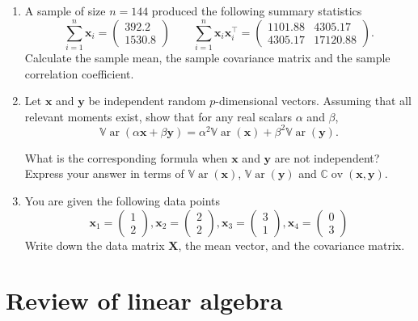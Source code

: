 \documentclass[
]{book}
\theoremstyle{definition}
\theoremstyle{definition}
\theoremstyle{definition}
\theoremstyle{definition}
\theoremstyle{remark}
\begin{document}
\begin{enumerate}
\def\labelenumi{\arabic{enumi}.}
\setcounter{enumi}{2}
\item
  A sample of size \(n=144\) produced the following summary statistics
  \[ \sum_{i=1}^n \mathbf x_i = \begin{pmatrix} 392.2 \\ 1530.8 \end{pmatrix} \qquad \sum_{i=1}^n \mathbf x_i \mathbf x_i^\top = \begin{pmatrix} 1101.88 & 4305.17 \\ 4305.17 & 17120.88 \end{pmatrix}.\]
  Calculate the sample mean, the sample covariance matrix and the sample correlation coefficient.
\item
  Let \(\mathbf x\) and \(\mathbf y\) be independent random \(p\)-dimensional vectors. Assuming that all relevant moments exist, show that for any real scalars \(\alpha\) and \(\beta\),
  \[{\mathbb{V}\operatorname{ar}}(\alpha \mathbf x+ \beta \mathbf y) = \alpha^2 {\mathbb{V}\operatorname{ar}}(\mathbf x) + \beta^2 {\mathbb{V}\operatorname{ar}}(\mathbf y).\]

  What is the corresponding formula when \(\mathbf x\) and \(\mathbf y\) are not independent? Express your answer in terms of \({\mathbb{V}\operatorname{ar}}(\mathbf x)\), \({\mathbb{V}\operatorname{ar}}(\mathbf y)\) and \({\mathbb{C}\operatorname{ov}}(\mathbf x, \mathbf y)\).
\item
  You are given the following data points
  \[\mathbf x_1 = \begin{pmatrix} 1\\ 2\end{pmatrix}, \mathbf x_2 = \begin{pmatrix} 2 \\ 2\end{pmatrix}, \mathbf x_3 = \begin{pmatrix} 3\\ 1\end{pmatrix}, \mathbf x_4 = \begin{pmatrix} 0 \\3\end{pmatrix}\]
  Write down the data matrix \(\mathbf X\), the mean vector, and the covariance matrix.
\end{enumerate}

\hypertarget{linalg-prelim}{%
\chapter{Review of linear algebra}\label{linalg-prelim}}
\end{document}
